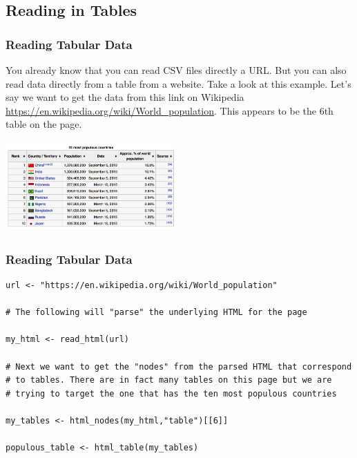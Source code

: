 \documentclass{beamer}
\begin{document}
%
\subsection{Reading in Tables}
\begin{frame}[fragile]
\frametitle{Reading Tabular Data}
\small
You already know that you can read CSV files directly a URL. But you can also read data directly from a table from a website. Take a look at this example. Let's say we want to get the data from this link on Wikipedia \url{https://en.wikipedia.org/wiki/World_population}. This appears to be the 6th table on the page. 
\begin{center}
\includegraphics[height=3.5cm,width=6.5cm]{../IMG/world_population_wiki.png}
\end{center}
\end{frame}

%
\begin{frame}[fragile]
\frametitle{Reading Tabular Data}
\footnotesize
\begin{verbatim}
url <- "https://en.wikipedia.org/wiki/World_population"

# The following will "parse" the underlying HTML for the page

my_html <- read_html(url)

# Next we want to get the "nodes" from the parsed HTML that correspond 
# to tables. There are in fact many tables on this page but we are 
# trying to target the one that has the ten most populous countries

my_tables <- html_nodes(my_html,"table")[[6]]

populous_table <- html_table(my_tables)
\end{verbatim}

\end{frame}
\end{document}
